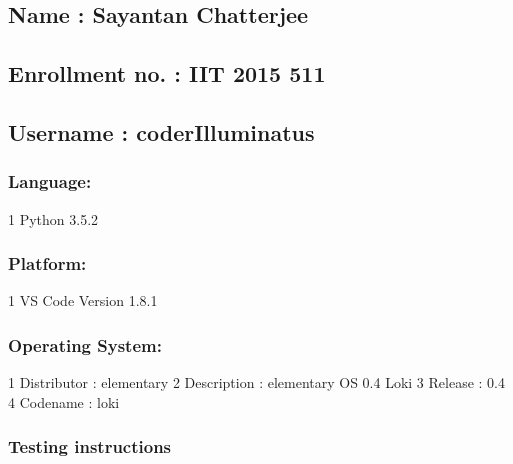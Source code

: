 \subsection*{Name \+: Sayantan Chatterjee}

\subsection*{Enrollment no. \+: I\+IT 2015 511}

\subsection*{Username \+: coder\+Illuminatus}

\subsubsection*{Language\+:}


\begin{DoxyCode}
1 Python 3.5.2
\end{DoxyCode}


\subsubsection*{Platform\+:}


\begin{DoxyCode}
1 VS Code Version 1.8.1
\end{DoxyCode}


\subsubsection*{Operating System\+:}


\begin{DoxyCode}
1 Distributor  : elementary
2 Description  : elementary OS 0.4 Loki
3 Release      : 0.4
4 Codename     : loki
\end{DoxyCode}


\subsubsection*{Testing instructions}


